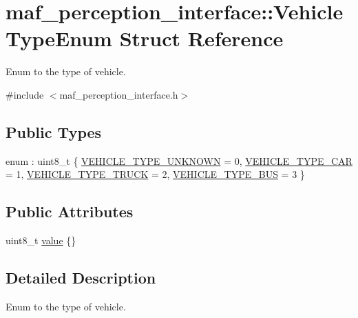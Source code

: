 \hypertarget{structmaf__perception__interface_1_1VehicleTypeEnum}{}\section{maf\+\_\+perception\+\_\+interface\+:\+:Vehicle\+Type\+Enum Struct Reference}
\label{structmaf__perception__interface_1_1VehicleTypeEnum}


Enum to the type of vehicle.  




{\ttfamily \#include $<$maf\+\_\+perception\+\_\+interface.\+h$>$}

\subsection*{Public Types}
\begin{DoxyCompactItemize}
\item 
enum \+: uint8\+\_\+t \{ \hyperlink{structmaf__perception__interface_1_1VehicleTypeEnum_aa7f36be2805ac59c8ce566f68438c8caa851b880464ce9ec5605086fbe76f8a44}{V\+E\+H\+I\+C\+L\+E\+\_\+\+T\+Y\+P\+E\+\_\+\+U\+N\+K\+N\+O\+WN} = 0, 
\hyperlink{structmaf__perception__interface_1_1VehicleTypeEnum_aa7f36be2805ac59c8ce566f68438c8caa4a2060bca53809604442f68e43063355}{V\+E\+H\+I\+C\+L\+E\+\_\+\+T\+Y\+P\+E\+\_\+\+C\+AR} = 1, 
\hyperlink{structmaf__perception__interface_1_1VehicleTypeEnum_aa7f36be2805ac59c8ce566f68438c8caac20bed2fdf80e955bbd8d339bd607442}{V\+E\+H\+I\+C\+L\+E\+\_\+\+T\+Y\+P\+E\+\_\+\+T\+R\+U\+CK} = 2, 
\hyperlink{structmaf__perception__interface_1_1VehicleTypeEnum_aa7f36be2805ac59c8ce566f68438c8caa71d584aab91e2b4975f15ce22a0ad0bd}{V\+E\+H\+I\+C\+L\+E\+\_\+\+T\+Y\+P\+E\+\_\+\+B\+US} = 3
 \}
\end{DoxyCompactItemize}
\subsection*{Public Attributes}
\begin{DoxyCompactItemize}
\item 
uint8\+\_\+t \hyperlink{structmaf__perception__interface_1_1VehicleTypeEnum_a4a3e8c2410ce769d7d9392676ccb0a92}{value} \{\}
\end{DoxyCompactItemize}


\subsection{Detailed Description}
Enum to the type of vehicle. 

